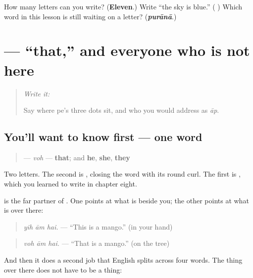 \begin{tcolorbox}[breakable,colback=teal!4,colframe=teal!35!black,title={Before you move on}]
How many letters can you write? (\textbf{Eleven}.) Write \textquotedblleft{}the sky is blue.\textquotedblright{} (\textbf{  }) Which word in this lesson is still waiting on a letter? (\emph{\textbf{purānā}}.)
\end{tcolorbox}
\section[\texorpdfstring{\ur{وہ} (voh)}{وہ (voh)}]{ — \textquotedblleft{}that,\textquotedblright{} and everyone who is not here}

\label{lesson:UR-C18-voh}



\begin{quote}
\emph{Write it:} 

Say where pe's three dots sit, and who you would address as \emph{āp}.
\end{quote}

\subsection*{You'll want to know first — one word}
\begin{quote}
\textbf{} — \emph{voh} — \textbf{that}; and \textbf{he}, \textbf{she}, \textbf{they}
\end{quote}

Two letters. The second is \textbf{}, closing the word with its round curl. The first is \textbf{}, which you learned to write in chapter eight.

\textbf{} is the far partner of \textbf{}. One points at what is beside you; the other points at what is over there:

\begin{quote}
\emph{yih ām hai.} — \textquotedblleft{}This is a mango.\textquotedblright{} (in your hand)
\end{quote}

\begin{quote}
\emph{voh ām hai.} — \textquotedblleft{}That is a mango.\textquotedblright{} (on the tree)
\end{quote}

And then it does a second job that English splits across four words. The thing over there does not have to be a thing:

